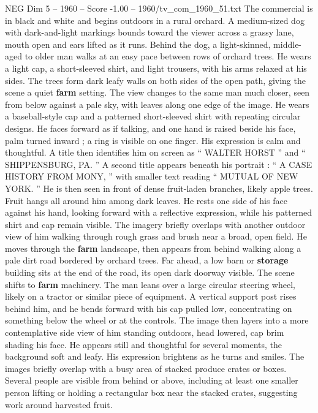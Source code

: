 \begin{textsample}{NEG Dim 5 – 1960 – Score -1.00 – 1960/tv\_com\_1960\_51.txt}  \label{ex:f5_neg_046}
The commercial is in black and white and begins outdoors in a rural orchard.
A medium-sized dog with dark-and-light markings bounds toward the viewer across a grassy lane, mouth open and ears lifted as it runs.
Behind the dog, a light-skinned, middle-aged to older man walks at an easy pace between rows of orchard trees.
He wears a light cap, a short-sleeved shirt, and light trousers, with his arms relaxed at his sides.
The trees form dark leafy walls on both sides of the open path, giving the scene a quiet \textbf{farm} setting.
The view changes to the same man much closer, seen from below against a pale sky, with leaves along one edge of the image.
He wears a baseball-style cap and a patterned short-sleeved shirt with repeating circular designs.
He faces forward as if talking, and one hand is raised beside his face, palm turned inward ; a ring is visible on one finger.
His expression is calm and thoughtful.
A title then identifies him on screen as “ WALTER HORST ” and “ SHIPPENSBURG, PA. ” A second title appears beneath his portrait : “ A CASE HISTORY FROM MONY, ” with smaller text reading “ MUTUAL OF NEW YORK. ” He is then seen in front of dense fruit-laden branches, likely apple trees.
Fruit hangs all around him among dark leaves.
He rests one side of his face against his hand, looking forward with a reflective expression, while his patterned shirt and cap remain visible.
The imagery briefly overlaps with another outdoor view of him walking through rough grass and brush near a broad, open field.
He moves through the \textbf{farm} landscape, then appears from behind walking along a pale dirt road bordered by orchard trees.
Far ahead, a low barn or \textbf{storage} building sits at the end of the road, its open dark doorway visible.
The scene shifts to \textbf{farm} machinery.
The man leans over a large circular steering wheel, likely on a tractor or similar piece of equipment.
A vertical support post rises behind him, and he bends forward with his cap pulled low, concentrating on something below the wheel or at the controls.
The image then layers into a more contemplative side view of him standing outdoors, head lowered, cap brim shading his face.
He appears still and thoughtful for several moments, the background soft and leafy.
His expression brightens as he turns and smiles.
The images briefly overlap with a busy area of stacked produce crates or boxes.
Several people are visible from behind or above, including at least one smaller person lifting or holding a rectangular box near the stacked crates, suggesting work around harvested fruit.

\end{textsample}
